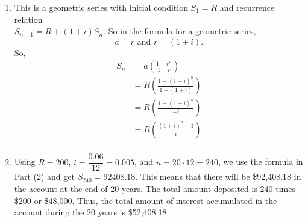 \begin{enumerate}
\begin{enumerate}
\item This is a geometric series with initial condition  $S_1 = R$ and recurrence relation  \\
$S_{n+1} = R + \left( {1+i} \right) S_n$.  So in the  formula for a geometric series,
\[
a = r \text{ and } r = \left( {1+i} \right).
\]
So,
\[
\begin{aligned}
  S_n  &= a\left( {\frac{{1 - r^n }}{{1 - r}}} \right) \\
       &= R\left( {\frac{{1 - \left( {1 + i} \right)^n }}{{1 - \left( {1 + i} \right)}}} \right) \\
       &= R\left( {\frac{{1 - \left( {1 + i} \right)^n }}{{ - i}}} \right) \\
       &= R\left( {\frac{{\left( {1 + i} \right)^n  - 1}}{i}} \right)  \\ 
\end{aligned}
\]
\item Using $R = 200$, $i = \dfrac{0.06}{12} = 0.005$, and $n = 20 \cdot 12 = 240$, we use the formula in Part (2) and get $S_{240} = 92408.18$.  This means that there will be \$92,408.18 in the account at the end of 20 years.  The total amount deposited is 240 times \$200 or \$48,000.  Thus, the total amount of interest accumulated in the account during the 20 years is \$52,408.18. 
\end{enumerate}
\end{enumerate}
\hbreak



\endinput


%
%
%


